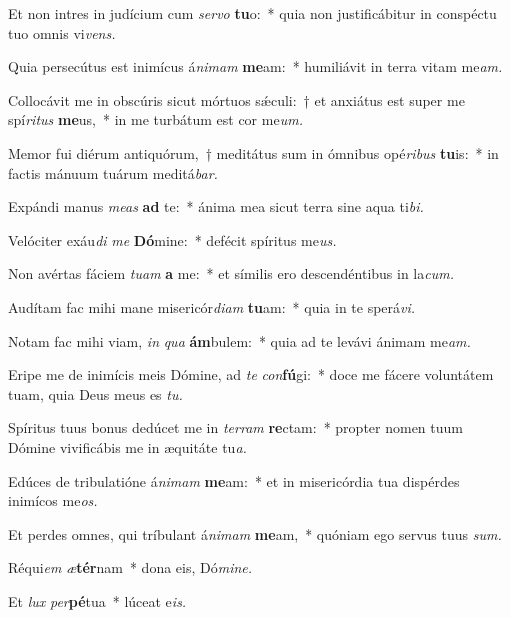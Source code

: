 \item Et non intres in judícium cum \textit{servo} \textbf{tu}o:~* quia non justificábitur in conspéctu tuo o\-mnis vi\textit{vens.}
\item Quia persecútus est inimícus á\hspace*{0.03em}\textit{nimam} \textbf{me}am:~* humiliávit in terra vitam me\textit{am.}
\item Collocávit me in obscúris sicut mórtuos sǽculi:~† et anxiátus est super me spí\textit{ritus} \textbf{me}us,~* in me turbátum est cor me\textit{um.}
\item Memor fui diérum antiquórum,~† meditátus sum in ómnibus opé\hspace*{0.03em}\textit{ribus} \textbf{tu}is:~* in factis mánuum tuárum meditá\textit{bar.}
\item Expándi manus \textit{meas} \textbf{ad} te:~* ánima mea sicut terra sine aqua ti\textit{bi.}
\item Velóciter exáu\hspace*{0.03em}\textit{di} \textit{me} \textbf{Dó}mine:~* defécit spíritus me\textit{us.}
\item Non avértas fáciem \textit{tuam} \textbf{a} me:~* et símilis ero descendéntibus in la\textit{cum.}
\item Audítam fac mihi mane misericór\textit{diam} \textbf{tu}am:~* quia in te sperá\hspace*{0.03em}\textit{vi.}
\item Notam fac mihi viam, \textit{in} \textit{qua} \textbf{ám}bulem:~* quia ad te levávi ánimam me\hspace*{0.03em}\textit{am.}
\item Eripe me de inimícis meis Dómine, ad \textit{te} \textit{con}\textbf{fú}gi:~* doce me fácere voluntátem tuam, quia Deus meus es \textit{tu.}
\item Spíritus tuus bonus dedúcet me in \textit{terram} \textbf{re}ctam:~* propter nomen tuum Dómine vivificábis me in æquitáte tu\hspace*{0.03em}\textit{a.}
\item Edúces de tribulatióne á\hspace*{0.03em}\textit{nimam} \textbf{me}am:~* et in misericórdia tua dispérdes inimícos me\textit{os.}
\item Et perdes omnes, qui tríbulant á\textit{nimam} \textbf{me}am,~* quóniam ego servus tuus \textit{sum.}
\item Réqui\hspace*{0.03em}\textit{em} \textit{æ}\textbf{tér}nam~* dona eis, Dó\textit{mine.}
\item Et \textit{lux} \textit{per}\textbf{pé}tua~* lúceat e\hspace*{0.03em}\textit{is.}
